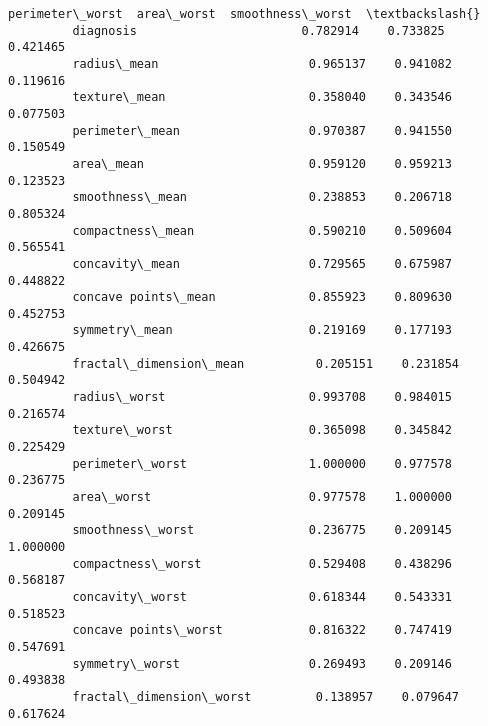 \documentclass[11pt]{article}
\begin{document}
\begin{Verbatim}[commandchars=\\\{\}]
                                  perimeter\_worst  area\_worst  smoothness\_worst  \textbackslash{}
         diagnosis                       0.782914    0.733825          0.421465   
         radius\_mean                     0.965137    0.941082          0.119616   
         texture\_mean                    0.358040    0.343546          0.077503   
         perimeter\_mean                  0.970387    0.941550          0.150549   
         area\_mean                       0.959120    0.959213          0.123523   
         smoothness\_mean                 0.238853    0.206718          0.805324   
         compactness\_mean                0.590210    0.509604          0.565541   
         concavity\_mean                  0.729565    0.675987          0.448822   
         concave points\_mean             0.855923    0.809630          0.452753   
         symmetry\_mean                   0.219169    0.177193          0.426675   
         fractal\_dimension\_mean          0.205151    0.231854          0.504942   
         radius\_worst                    0.993708    0.984015          0.216574   
         texture\_worst                   0.365098    0.345842          0.225429   
         perimeter\_worst                 1.000000    0.977578          0.236775   
         area\_worst                      0.977578    1.000000          0.209145   
         smoothness\_worst                0.236775    0.209145          1.000000   
         compactness\_worst               0.529408    0.438296          0.568187   
         concavity\_worst                 0.618344    0.543331          0.518523   
         concave points\_worst            0.816322    0.747419          0.547691   
         symmetry\_worst                  0.269493    0.209146          0.493838   
         fractal\_dimension\_worst         0.138957    0.079647          0.617624   
         

\end{Verbatim}
\end{document}
